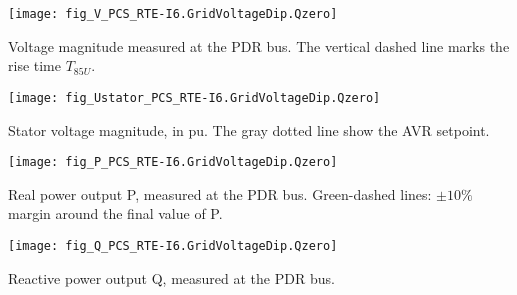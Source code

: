     \noindent
    \begin{minipage}[t]{0.48\textwidth}
        \centering
        \texttt{[image: fig\_V\_PCS\_RTE-I6.GridVoltageDip.Qzero]}
        \begin{minipage}[t]{0.8\textwidth}
            \small Voltage magnitude measured at the PDR bus.
            The vertical dashed line marks the rise time $T_{85U}$.
        \end{minipage}
    \end{minipage}
    \hfill
    \begin{minipage}[t]{0.48\textwidth}
        \centering
        \texttt{[image: fig\_Ustator\_PCS\_RTE-I6.GridVoltageDip.Qzero]}
        \begin{minipage}[t]{0.8\textwidth}
            \small Stator voltage magnitude, in pu. The gray dotted line show
            the AVR setpoint.
        \end{minipage}
    \end{minipage}

    \vspace{0.5cm}

    \noindent
    \begin{minipage}[t]{0.48\textwidth}
        \centering
        \texttt{[image: fig\_P\_PCS\_RTE-I6.GridVoltageDip.Qzero]}
        \begin{minipage}[t]{0.8\textwidth}
            \small Real power output P, measured at the PDR bus. Green-dashed
            lines: $\pm 10\%$ margin around the final value of P.
        \end{minipage}
    \end{minipage}
    \hfill
    \begin{minipage}[t]{0.48\textwidth}
        \centering
        \texttt{[image: fig\_Q\_PCS\_RTE-I6.GridVoltageDip.Qzero]}
        \begin{minipage}[t]{0.8\textwidth}
            \small Reactive power output Q, measured at the PDR bus.
        \end{minipage}
    \end{minipage}

    \vspace{0.5cm}

